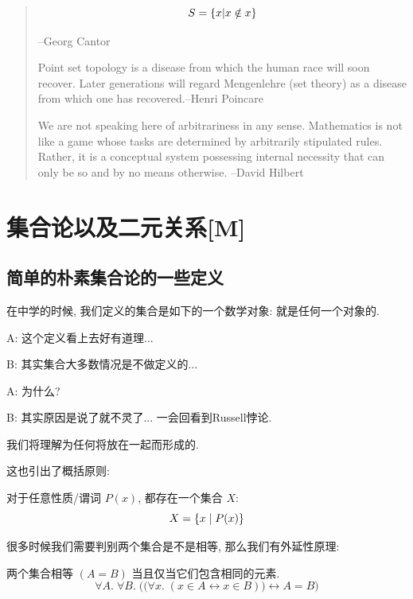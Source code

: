 \begin{quote}
	$$S=\{x|x\notin x\}$$
	
	\hfill --Georg Cantor

	Point set topology is a disease from which the human race will soon recover. Later generations will regard Mengenlehre (set theory) as a disease from which one has recovered.\hfill --Henri Poincare
	
	We are not speaking here of arbitrariness in any sense. Mathematics is not like a game whose tasks are determined by arbitrarily stipulated rules. Rather, it is a conceptual system possessing internal necessity that can only be so and by no means otherwise. \hfill --David Hilbert
\end{quote}

\chapter{集合论以及二元关系[M]}
\section{简单的朴素集合论的一些定义}

在中学的时候, 我们定义的集合是如下的一个数学对象: 就是任何一个对象的. 

\begin{dialogue}
	A: 这个定义看上去好有道理...
	
	B: 其实集合大多数情况是不做定义的...
	
	A: 为什么?
	
	B: 其实原因是说了就不灵了... 一会回看到Russell悖论. 
\end{dialogue}

\begin{definition}[集合]
    我们将理解为任何将放在一起而形成的. 
\end{definition}

这也引出了概括原则: 

\begin{theorem}[概括原则]
    对于任意性质/谓词 $P(x)$, 都存在一个集合 $X$:
    \[
      X = \{x \mid P(x)\}
    \]
\end{theorem}

很多时候我们需要判别两个集合是不是相等, 那么我们有外延性原理: 
\begin{definition}
    两个集合相等 $(A = B)$ 当且仅当它们包含相同的元素. 
    \[
      \forall A.\; \forall B.\;
        \Big(\big(\forall x.\; (x \in A \leftrightarrow x \in B)\big)
          \leftrightarrow A = B \Big)
    \]
\end{definition}


